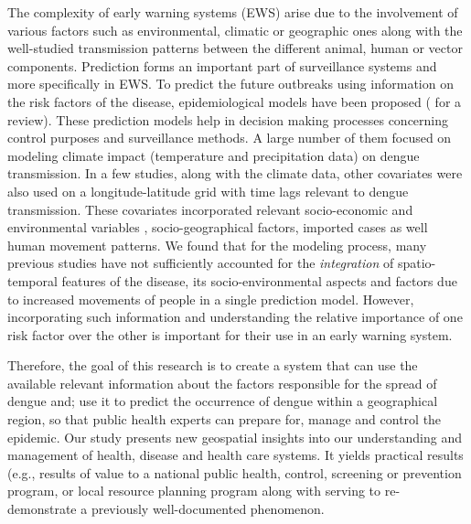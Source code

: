 \documentclass{bmcart}
\begin{document}
The complexity of early warning systems (EWS) arise due to the involvement of various factors such as environmental, climatic or geographic ones along with the well-studied transmission patterns between the different animal, human or vector components. Prediction forms an important part of surveillance systems and more specifically in EWS. To predict the future outbreaks using information on the risk factors of the disease, epidemiological models have been proposed (\cite{racloz2012surveillance} for a review). These prediction models help in decision making processes concerning control purposes and surveillance methods. A large number of them \cite{degallier2010toward, naish2014climate, hii2012forecast} focused on modeling climate impact (temperature and precipitation data) on dengue transmission. In a few studies, along with the climate data, other covariates were also used on a longitude-latitude grid with time lags relevant to dengue transmission. These covariates incorporated relevant socio-economic and environmental variables \cite{lowe2011spatio, banu2011dengue}, socio-geographical factors\cite{toledo2011evidence, tipayamongkholgul2011socio}, imported cases\cite{shang2010role, sang2015predicting} as well human movement patterns\cite{stoddard2013house, reiner2014socially}. We found that for the modeling process, many previous studies have not sufficiently accounted for the \textit{integration} of spatio-temporal features of the disease, its socio-environmental aspects and factors due to increased movements of people in a single prediction model. However, incorporating such information and understanding the relative importance of one risk factor over the other is important for their use in an early warning system.


Therefore, the goal of this research is to create a system that can use the available relevant information about the factors responsible for the spread of dengue and; use it to predict the occurrence of dengue within a geographical region, so that public health experts can prepare for, manage and control the epidemic. Our study presents new geospatial insights into our understanding and management of health, disease and health care systems. It yields practical results (e.g., results of value to a national public health, control, screening or prevention program, or local resource planning program along with serving to re-demonstrate a previously well-documented phenomenon. 
\end{document}
